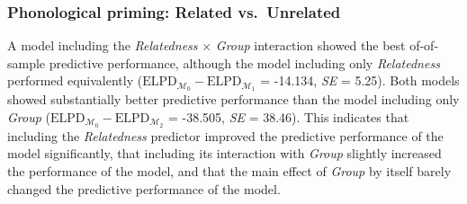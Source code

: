 \documentclass[
  letterpaper,
  DIV=11,
  numbers=noendperiod]{scrartcl}
\begin{document}
\hypertarget{phonological-priming-related-vs.-unrelated-1}{%
\subsubsection{Phonological priming: Related
vs.~Unrelated}\label{phonological-priming-related-vs.-unrelated-1}}

A model including the \emph{Relatedness} \(\times\) \emph{Group}
interaction showed the best of-of-sample predictive performance,
although the model including only \emph{Relatedness} performed
equivalently
(\(\text{ELPD}_{\mathcal{M_0}} - \text{ELPD}_{\mathcal{M_1}}\) =
-14.134, \emph{SE} = 5.25). Both models showed substantially better
predictive performance than the model including only \emph{Group}
(\(\text{ELPD}_{\mathcal{M_0}} - \text{ELPD}_{\mathcal{M_2}}\) =
-38.505, \emph{SE} = 38.46). This indicates that including the
\emph{Relatedness} predictor improved the predictive performance of the
model significantly, that including its interaction with \emph{Group}
slightly increased the performance of the model, and that the main
effect of \emph{Group} by itself barely changed the predictive
performance of the model.
\end{document}
